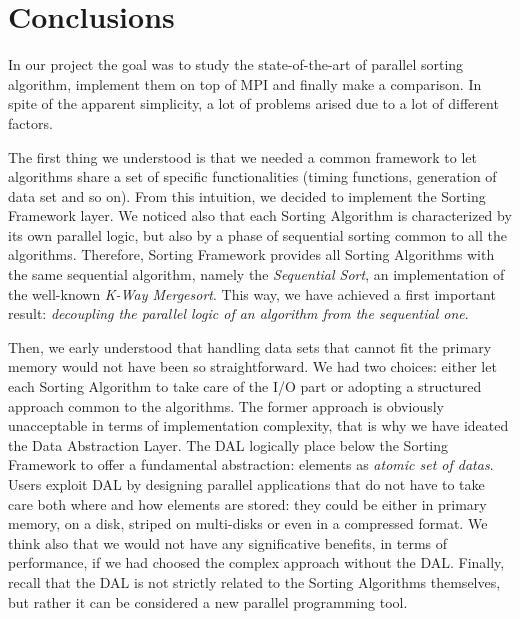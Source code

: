 \label{conclusion}
\section{Conclusions}
In our project the goal was to study the state-of-the-art of parallel sorting algorithm, implement them on top of MPI and finally make a comparison. In spite of the apparent simplicity, a lot of problems arised due to a lot of different factors.  

The first thing we understood is that we needed a common framework to let algorithms share a set of specific functionalities (timing functions, generation of data set and so on). From this intuition, we decided to implement the Sorting Framework layer. We noticed also that each Sorting Algorithm is characterized by its own parallel logic, but also by a phase of sequential sorting common to all the algorithms. Therefore, Sorting Framework provides all Sorting Algorithms with the same sequential algorithm, namely the \textit{Sequential Sort}, an implementation of the well-known \textit{K-Way Mergesort}. This way, we have achieved a first important result: \textit{decoupling the parallel logic of an algorithm from the sequential one}. 

Then, we early understood that handling data sets that cannot fit the primary memory would not have been so straightforward. We had two choices: either let each Sorting Algorithm to take care of the I/O part or adopting a structured approach common to the algorithms. The former approach is obviously unacceptable in terms of implementation complexity, that is why we have ideated the Data Abstraction Layer. The DAL logically place below the Sorting Framework to offer a fundamental abstraction: elements as \textit{atomic set of datas}. Users exploit DAL by designing parallel applications that do not have to take care both where and how elements are stored: they could be either in primary memory, on a disk, striped on multi-disks or even in a compressed format. We think also that we would not have any significative benefits, in terms of performance, if we had choosed the complex approach without the DAL. Finally, recall that the DAL is not strictly related to the Sorting Algorithms themselves, but rather it can be considered a new parallel programming tool.


